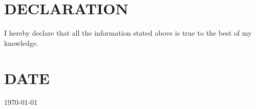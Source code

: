 \documentclass[margin,line]{res}
\begin{document}
\begin{resume}
\section{\sc DECLARATION} I hereby declare that all the information stated above is true to the best of my knowledge.

\section{\sc DATE} \today

\end{resume}
\end{document}
